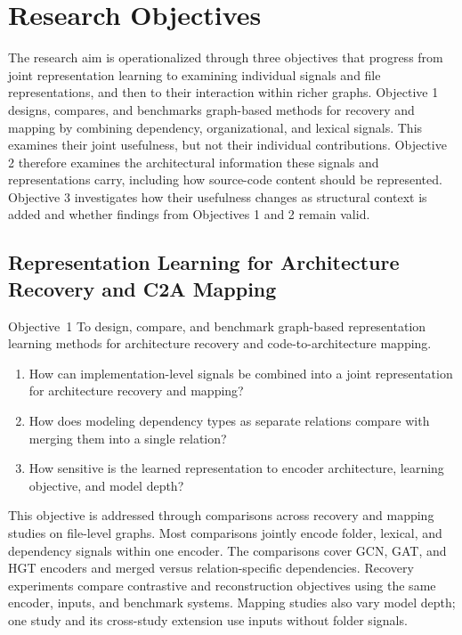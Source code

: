 \section{Research Objectives}
\label{sec:research-objectives}

The research aim is operationalized through three objectives that progress from joint representation learning to examining individual signals and file representations, and then to their interaction within richer graphs. Objective 1 designs, compares, and benchmarks graph-based methods for recovery and mapping by combining dependency, organizational, and lexical signals. This examines their joint usefulness, but not their individual contributions. Objective 2 therefore examines the architectural information these signals and representations carry, including how source-code content should be represented. Objective 3 investigates how their usefulness changes as structural context is added and whether findings from Objectives 1 and 2 remain valid.

\subsection[Representation Learning for Recovery and Mapping]{Representation Learning for Architecture Recovery and C2A Mapping}
\label{sec:obj_1}

\begin{GrayBox}{Objective~1}
To design, compare, and benchmark graph-based representation learning methods for architecture recovery and code-to-architecture mapping.
\end{GrayBox}
\begin{enumerate}[label=RQ1.\arabic*, leftmargin=3em, itemsep=0.1pt]
    \item How can implementation-level signals be combined into a joint representation for architecture recovery and mapping?
    \item How does modeling dependency types as separate relations compare with merging them into a single relation?
    \item How sensitive is the learned representation to encoder architecture, learning objective, and model depth?
\end{enumerate}
This objective is addressed through comparisons across recovery and mapping studies on file-level graphs. Most comparisons jointly encode folder, lexical, and dependency signals within one encoder. The comparisons cover GCN, GAT, and HGT encoders and merged versus relation-specific dependencies. Recovery experiments compare contrastive and reconstruction objectives using the same encoder, inputs, and benchmark systems. Mapping studies also vary model depth; one study and its cross-study extension use inputs without folder signals.
